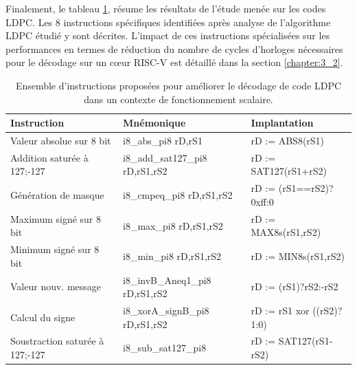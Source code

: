 \documentclass[../main.tex]{subfiles}
\begin{document}
Finalement, le tableau \ref{tab:instr_ldpc}, résume les résultats de l'étude menée sur les codes LDPC. Les 8 instructions spécifiques identifiées après analyse de l'algorithme LDPC étudié y sont décrites. L'impact de ces instructions spécialisées sur les performances en termes de réduction du nombre de cycles d'horloges nécessaires pour le décodage sur un cœur RISC-V est détaillé dans la section \ref{chapter:3_2}. 
\begin{table}[!tb]
\footnotesize
\centering
\begin{tabular}{ l || l l }
\hline
\textbf{Instruction}            & \textbf{Mnémonique}              & \textbf{Implantation} \\
\hline
Valeur absolue sur 8 bit        & i8\_abs\_pi8 rD,rS1              & rD := ABS8(rS1)   \\ 
Addition saturée à 127;-127     & i8\_add\_sat127\_pi8 rD,rS1,rS2  & rD := SAT127(rS1+rS2)   \\ 
Génération de masque            & i8\_cmpeq\_pi8 rD,rS1,rS2        & rD := (rS1==rS2)?0xff:0   \\ 
Maximum signé sur 8 bit         & i8\_max\_pi8 rD,rS1,rS2          & rD := MAX8s(rS1,rS2)  \\ 
Minimum signé sur 8 bit         & i8\_min\_pi8 rD,rS1,rS2          & rD := MIN8s(rS1,rS2) \\ 
Valeur nouv. message            & i8\_invB\_Aneq1\_pi8 rD,rS1,rS2  & rD := (rS1\geqslant1)?rS2:-rS2 \\ 
Calcul du signe                 & i8\_xorA\_signB\_pi8 rD,rS1,rS2  & rD := rS1 xor ((rS2\geqslant0)?1:0) \\
Soustraction saturée à 127;-127 & i8\_sub\_sat127\_pi8             & rD := SAT127(rS1-rS2) \\ 
\hline
\end{tabular}
\caption{Ensemble d'instructions proposées pour améliorer le décodage de code LDPC dans un contexte de fonctionnement scalaire.}
\label{tab:instr_ldpc}
\end{table}
%
%
%
%
\end{document}
